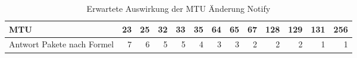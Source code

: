 \begin{table}
\centering
\caption{Erwartete Auswirkung der MTU Änderung Notify}
\label{table:estimatednotifyPakets}
\begin{tabular}{lrrrrrrrrrrrr}
\toprule
MTU &  23  &  25  &  32  &  33  &  35  &  64  &  65  &  67  &  128 &  129 &  131 &  256 \\
\midrule
Antwort Pakete nach Formel &    7 &    6 &    5 &    5 &    4 &    3 &    3 &    2 &    2 &    2 &    1 &    1 \\
\bottomrule
\end{tabular}
\end{table}
